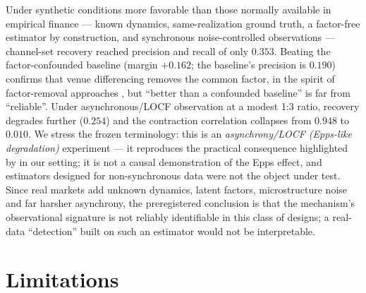 \documentclass[11pt]{article}
\begin{document}
Under synthetic conditions more favorable than those normally available in
empirical finance --- known dynamics, same-realization ground truth, a
factor-free estimator by construction, and synchronous noise-controlled
observations --- channel-set recovery reached precision and recall of only
$0.353$. Beating the
factor-confounded baseline (margin $+0.162$; the baseline's precision is
$0.190$) confirms that venue differencing removes the common factor, in the
spirit of factor-removal approaches
\citep{fan2013large,barigozzi2017network}, but ``better than a confounded
baseline'' is far from ``reliable''. Under asynchronous/LOCF observation at a
modest 1:3 ratio, recovery degrades further ($0.254$) and the contraction
correlation collapses from $0.948$ to $0.010$. We stress the frozen
terminology: this is an \emph{asynchrony/LOCF (Epps-like degradation)}
experiment --- it reproduces the practical consequence highlighted by
\citet{epps1979comovements} in our setting; it is not a causal demonstration
of the Epps effect, and estimators designed for non-synchronous data
\citep{hayashi2005covariance,scholes1977estimating} were not the object under
test. Since real markets add unknown dynamics, latent factors, microstructure
noise and far harsher asynchrony, the preregistered conclusion is that the
mechanism's observational signature is not reliably identifiable in this
class of designs; a real-data ``detection'' built on such an estimator would
not be interpretable.

\section{Limitations}
\label{sec:limitations}
\end{document}
